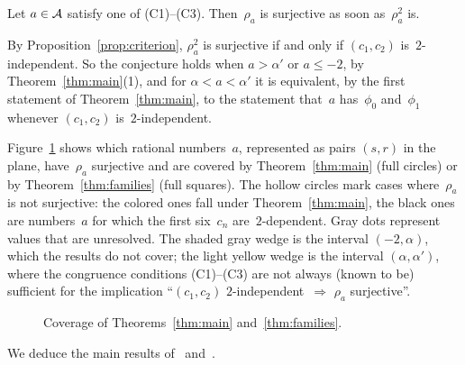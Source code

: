 \begin{conjecture}
  \label{conj:main}
  Let $a \in \mathcal{A}$ satisfy one of (C1)--(C3). Then~$\rho_a$ is surjective as soon as~$\rho_a^2$
  is.
\end{conjecture}

By Proposition~\ref{prop:criterion}, $\rho_a^2$ is surjective if and only if $(c_1, c_2)$
is~$2$-independent. So the conjecture holds when $a > \alpha'$ or $a \le -2$, by
Theorem~\ref{thm:main}(1), and for $\alpha < a < \alpha'$ it is equivalent, by the first
statement of Theorem~\ref{thm:main}, to the statement that~$a$ has~$\phi_0$ and~$\phi_1$
whenever $(c_1, c_2)$ is~$2$-independent.

Figure~\ref{fig:coverage} shows which rational numbers~$a$, represented as pairs $(s, r)$ in the
plane, have~$\rho_a$ surjective and are covered by Theorem~\ref{thm:main} (full circles) or by
Theorem~\ref{thm:families} (full squares). The hollow circles mark cases where~$\rho_a$ is not
surjective: the colored ones fall under Theorem~\ref{thm:main}, the black ones are numbers~$a$
for which the first six~$c_n$ are~$2$-dependent. Gray dots represent values that are
unresolved. The shaded gray wedge is the interval $(-2, \alpha)$, which the results do not
cover; the light yellow wedge is the interval $(\alpha, \alpha')$, where the congruence
conditions (C1)--(C3) are not always (known to be) sufficient for the implication
``$(c_1, c_2)$ $2$-independent~$\Rightarrow$ $\rho_a$ surjective''.

\begin{figure}[htb]
  \centering
  \coverageplot
  \caption{Coverage of Theorems~\ref{thm:main} and~\ref{thm:families}.}
  \label{fig:coverage}
\end{figure}

We deduce the main results of~\cite{paper} and~\cite{li2020}.

